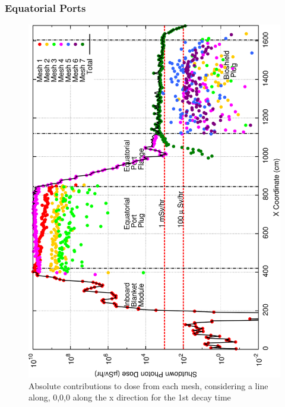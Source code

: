 \documentclass[12pt]{article}
\begin{document}
\subsubsection*{Equatorial Ports}
\begin{figure}[ht!]
\centering
\includegraphics[clip,scale=0.25]{../plots/crosstalk/b4c/ep/dc1.png}
\caption{Absolute contributions to dose from each mesh, considering a line along, 0,0,0 along the x direction for the 1st decay time}
\label{fig:ct_ep_dc1}
\end{figure}
\end{document}
